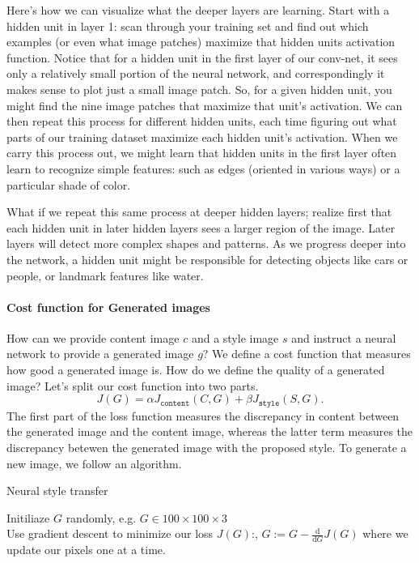\documentclass[12pt]{article}
\begin{document}
Here's how we can visualize what the deeper layers are learning. Start with a hidden unit in layer 1: scan through your training set and find out which examples (or even what image patches) maximize that hidden units activation function. Notice that for a hidden unit in the first layer of our conv-net, it sees only a relatively small portion of the neural network, and correspondingly it makes sense to plot just a small image patch. So, for a given hidden unit, you might find the nine image patches that maximize that unit's activation. We can then repeat this process for different hidden units, each time figuring out what parts of our training dataset maximize each hidden unit's activation.
When we carry this process out, we might learn that hidden units in the first layer often learn to recognize simple features: such as edges (oriented in various ways) or a particular shade of color.

What if we repeat this same process at deeper hidden layers; realize first that each hidden unit in later hidden layers sees a larger region of the image. Later layers will detect more complex shapes and patterns. As we progress deeper into the network, a hidden unit might be responsible for detecting objects like cars or people, or landmark features like water.

\paragraph{Cost function for Generated images} How can we provide content image $c$ and a style image $s$ and instruct a neural network to provide a generated image $g$? We define a cost function that measures how good a generated image is. How do we define the quality of a generated image? Let's split our cost function into two parts.
\[
J(G) = \alpha J_{\texttt{content}}(C,G) + \beta J_{\texttt{style}}(S,G).
\]
The first part of the loss function measures the discrepancy in content between the generated image and the content image, whereas the latter term measures the discrepancy betewen the generated image with the proposed style. To generate a new image, we follow an algorithm.
\begin{algorithm}
  \caption{Neural style transfer}
  Initiliaze $G$ randomly, e.g. $G \in 100 \times 100 \times 3$ \\
  Use gradient descent to minimize our loss $J(G)$:, $G := G - \frac{\textrm{d}}{\textrm{d} G} J(G)$ where we update our pixels one at a time.
\end{algorithm}
\end{document}

